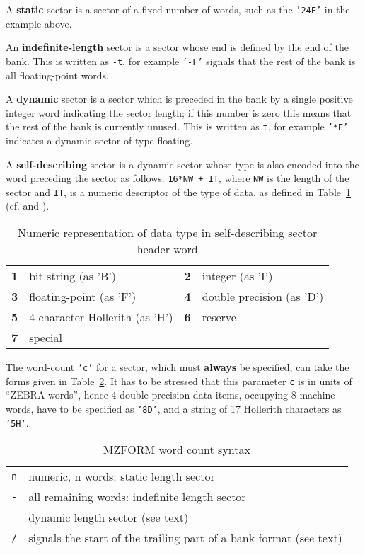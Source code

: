 \par A {\bf static} sector is a sector of a fixed number of words,
such as the {\tt '24F'} in the example above.
\par An {\bf indefinite-length}
sector is a sector whose end is defined
by the end of the bank.
This is written as {\tt -t}, for example
{\tt '-F'} signals that the rest
of the bank is all floating-point words.
\par A {\bf dynamic} sector is
a sector which is preceded in the bank
by a single positive integer word indicating the sector length;
if this number is zero this means that the rest of
the bank is currently unused.
This is written as  {\tt *t}, for example
{\tt '*F'} indicates a dynamic sector of type floating.
\par A {\bf self-describing} sector is a dynamic sector whose type
is also encoded into the word preceding the sector as follows:
{\tt 16*NW + IT}, where {\tt NW} is the length of the
sector and {\tt IT}, is a numeric descriptor of the type of
data, as defined in Table~\ref{MZFORMS}
(cf.  and ).
\begin{table}[h]
\caption{Numeric representation of data type in self-describing sector header word}
\label{MZFORMS}
\begin{center}\begin{tabular}{|c|l|c|l|}
\hline
{\bf 1}&bit string (as 'B')           &{\bf 2}&integer (as 'I')\\
{\bf 3}&floating-point (as 'F')       &{\bf 4}&double precision (as 'D')\\
{\bf 5}&4-character Hollerith (as 'H')&{\bf 6}&reserve\\
{\bf 7}&special                       &&\\ \hline
\end{tabular}\end{center}\end{table}
The word-count {\tt 'c'} for a sector,
which must {\bf always} be specified, can take the forms
given in Table~\ref{MZFORMC}.
It has to be stressed that this parameter {\tt c} is in units of
``ZEBRA words'', hence 4 double precision data items,
occupying 8 machine words, have to be specified as {\tt '8D'},
and a string of 17 Hollerith characters as {\tt '5H'}.
\begin{table}[h]
\caption{MZFORM word count syntax}
\label{MZFORMC}
\begin{center}\begin{tabular}{|l|l|}\hline
\tt n&numeric, n words: static length sector\\
\tt -&all remaining words: indefinite length sector\\
\tt *&dynamic length sector (see text)\\
\tt /&signals the start of the trailing part of a bank format (see text)
\\ \hline
\end{tabular}\end{center}
\end{table}
